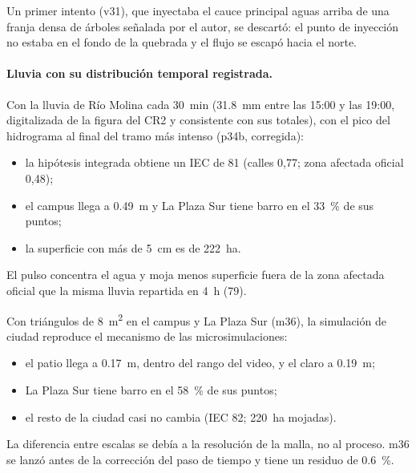 Un primer intento (v31), que inyectaba el cauce principal aguas arriba de una franja densa de árboles señalada por el autor, se descartó: el punto de inyección no estaba en el fondo de la quebrada y el flujo se escapó hacia el norte.

\paragraph{Lluvia con su distribución temporal registrada.} Con la lluvia de Río Molina cada \SI{30}{min} (\SI{31,8}{mm} entre las 15:00 y las 19:00, digitalizada de la figura del CR2 y consistente con sus totales), con el pico del hidrograma al final del tramo más intenso (p34b, corregida):
\begin{itemize}
\item la hipótesis integrada obtiene un IEC de 81 (calles 0,77; zona afectada oficial 0,48);
\item el campus llega a \SI{0,49}{m} y La Plaza Sur tiene barro en el \SI{33}{\percent} de sus puntos;
\item la superficie con más de \SI{5}{cm} es de \SI{222}{ha}.
\end{itemize}
El pulso concentra el agua y moja menos superficie fuera de la zona afectada oficial que la misma lluvia repartida en \SI{4}{h} (79).

Con triángulos de \SI{8}{m^2} en el campus y La Plaza Sur (m36), la simulación de ciudad reproduce el mecanismo de las microsimulaciones:
\begin{itemize}
\item el patio llega a \SI{0,17}{m}, dentro del rango del video, y el claro a \SI{0,19}{m};
\item La Plaza Sur tiene barro en el \SI{58}{\percent} de sus puntos;
\item el resto de la ciudad casi no cambia (IEC 82; \SI{220}{ha} mojadas).
\end{itemize}
La diferencia entre escalas se debía a la resolución de la malla, no al proceso. m36 se lanzó antes de la corrección del paso de tiempo y tiene un residuo de \SI[retain-explicit-plus=true]{+0,6}{\percent}.

